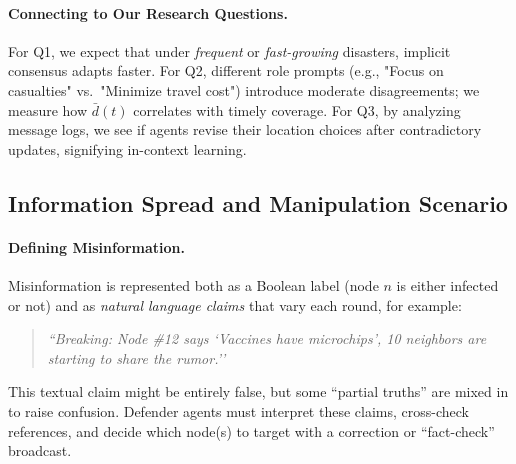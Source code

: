 \paragraph{Connecting to Our Research Questions.}
For Q1, we expect that under \emph{frequent} or \emph{fast-growing} disasters, implicit consensus adapts faster.  For Q2, different role prompts (e.g., "Focus on casualties" vs.\ "Minimize travel cost") introduce moderate disagreements; we measure how $\bar{d}(t)$ correlates with timely coverage. For Q3, by analyzing message logs, we see if agents revise their location choices after contradictory updates, signifying in-context learning.

\subsection{Information Spread and Manipulation Scenario}

\paragraph{Defining Misinformation.}
Misinformation is represented both as a Boolean label (node $n$ is either infected or not) and as \emph{natural language claims} that vary each round, for example:
\begin{quote}
\small
\emph{``Breaking: Node \#12 says `Vaccines have microchips’, 10 neighbors are starting to share the rumor.''}
\normalsize
\end{quote}
This textual claim might be entirely false, but some “partial truths” are mixed in to raise confusion. Defender agents must interpret these claims, cross-check references, and decide which node(s) to target with a correction or “fact-check” broadcast.

